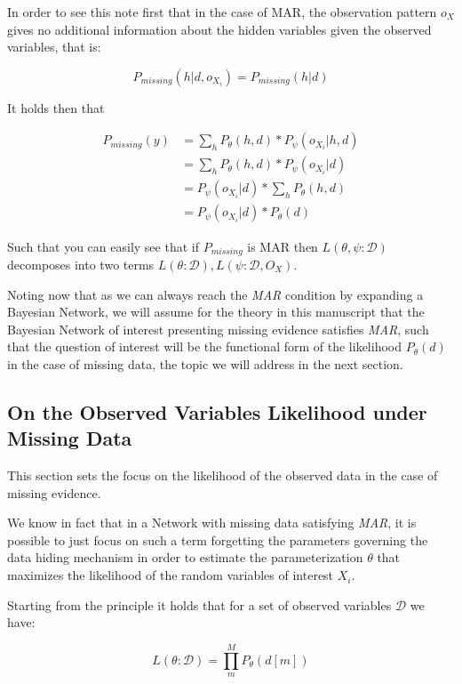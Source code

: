\documentclass[11pt]{article}
\begin{document}
\begin{article}
In order to see this note first that in the case of MAR, the
observation pattern \(o_X\) gives no additional information about the
hidden variables given the observed variables, that is:

$$ P_{missing} (h | d, o_{X_i}) =  P_{missing} (h | d) $$

It holds then that 


\begin{align}
P_{missing}(y) &= \sum_h P_{\theta} (h, d) * P_\psi(o_{X_i} | h, d) \nonumber \\
             &= \sum_h P_{\theta} (h, d) * P_\psi(o_{X_i} | d) \nonumber \\
             &= P_\psi(o_{X_i} | d) * \sum_h P_{\theta} (h, d)  \nonumber \\
	     &= P_\psi(o_{X_i} | d) * P_{\theta} (d)  \nonumber		
\end{align}

Such that you can easily see that if \(P_{missing}\) is MAR then
\(L(\theta, \psi : \mathscr{D})\) decomposes into two terms \(L(\theta :
   \mathscr{D}), L(\psi : \mathscr{D}, O_X)\).

Noting now that as we can always reach the \emph{MAR} condition by
expanding a Bayesian Network, we will assume for the theory in this
manuscript that the Bayesian Network of interest presenting missing
evidence satisfies \emph{MAR}, such that the question of interest will
be the functional form of the likelihood \(P_{\theta} (d)\) in the
case of missing data, the topic we will address in the next
section.

\subsection{On the Observed Variables Likelihood under Missing Data}
\label{sec:orgf7e928a}

This section sets the focus on the likelihood of the observed data
in the case of missing evidence.

We know in fact that in a Network with missing data satisfying
\emph{MAR}, it is possible to just focus on such a term forgetting the
parameters governing the data hiding mechanism in order to estimate
the parameterization \(\theta\) that maximizes the likelihood of the
random variables of interest \(X_i\).

Starting from the principle it holds that for a set of observed
variables \(\mathscr{D}\) we have:

$$ L(\theta: \mathscr{D}) = \prod_m^M P_\theta(d[m]) $$


\end{article}
\end{document}
